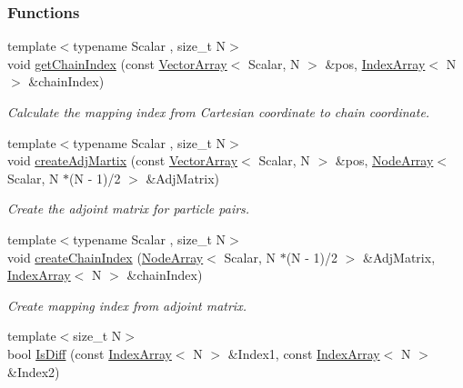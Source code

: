 \subsubsection*{Functions}
\begin{DoxyCompactItemize}
\item 
{\footnotesize template$<$typename Scalar , size\+\_\+t N$>$ }\\void \mbox{\hyperlink{namespacechain_a3e7b0a001442f121ce1408e7c9d12016}{get\+Chain\+Index}} (const \mbox{\hyperlink{namespacechain_aa715d2f046187ea9f0c3ea55605d6214}{Vector\+Array}}$<$ Scalar, N $>$ \&pos, \mbox{\hyperlink{namespacechain_aa40d2da395c0ac2bc5f37832442ac403}{Index\+Array}}$<$ N $>$ \&chain\+Index)
\begin{DoxyCompactList}\small\item\em Calculate the mapping index from Cartesian coordinate to chain coordinate. \end{DoxyCompactList}\item 
{\footnotesize template$<$typename Scalar , size\+\_\+t N$>$ }\\void \mbox{\hyperlink{namespacechain_a68d5d08ece7d82a6b4bb1968b783a8f3}{create\+Adj\+Martix}} (const \mbox{\hyperlink{namespacechain_aa715d2f046187ea9f0c3ea55605d6214}{Vector\+Array}}$<$ Scalar, N $>$ \&pos, \mbox{\hyperlink{namespacechain_a3a021b84403e03113e1dcd61ba304963}{Node\+Array}}$<$ Scalar, N $\ast$(N -\/ 1)/2 $>$ \&Adj\+Matrix)
\begin{DoxyCompactList}\small\item\em Create the adjoint matrix for particle pairs. \end{DoxyCompactList}\item 
{\footnotesize template$<$typename Scalar , size\+\_\+t N$>$ }\\void \mbox{\hyperlink{namespacechain_ae008a8273beabf1473c347994197ef53}{create\+Chain\+Index}} (\mbox{\hyperlink{namespacechain_a3a021b84403e03113e1dcd61ba304963}{Node\+Array}}$<$ Scalar, N $\ast$(N -\/ 1)/2 $>$ \&Adj\+Matrix, \mbox{\hyperlink{namespacechain_aa40d2da395c0ac2bc5f37832442ac403}{Index\+Array}}$<$ N $>$ \&chain\+Index)
\begin{DoxyCompactList}\small\item\em Create mapping index from adjoint matrix. \end{DoxyCompactList}\item 
{\footnotesize template$<$size\+\_\+t N$>$ }\\bool \mbox{\hyperlink{namespacechain_a874f28a6248b56c6b2b3ca45c1bbea09}{Is\+Diff}} (const \mbox{\hyperlink{namespacechain_aa40d2da395c0ac2bc5f37832442ac403}{Index\+Array}}$<$ N $>$ \&Index1, const \mbox{\hyperlink{namespacechain_aa40d2da395c0ac2bc5f37832442ac403}{Index\+Array}}$<$ N $>$ \&Index2)

\end{DoxyCompactItemize}
